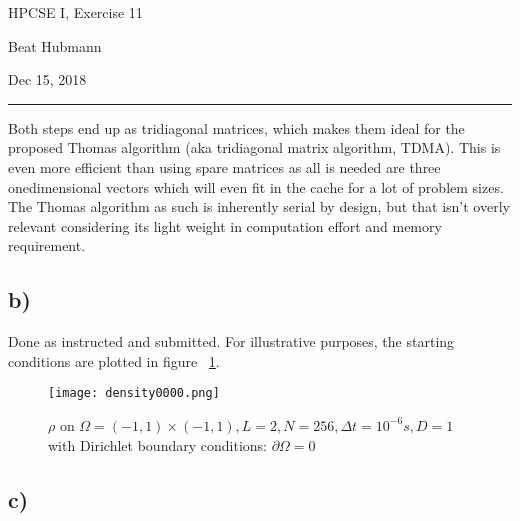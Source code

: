 \documentclass[11pt,a4paper]{article}
\begin{document}
\noindent\parbox{\linewidth}{
 \parbox{.25\linewidth}{ \large HPCSE I, Exercise 11 }\hfill
 \parbox{.5\linewidth}{\begin{center} \large Beat Hubmann \end{center}}\hfill
 \parbox{.2\linewidth}{\begin{flushright} \large Dec 15, 2018 \end{flushright}}
}
\noindent\rule{\linewidth}{2pt}



Both steps end up as tridiagonal matrices, which makes them ideal for the proposed
Thomas algorithm (aka tridiagonal matrix algorithm, TDMA). This is even more efficient than
using spare matrices as all is needed are three onedimensional vectors which will even
fit in the cache for a lot of problem sizes. The Thomas algorithm as such is inherently serial by design,
but that isn't overly relevant considering its light weight in computation effort and memory requirement.

\subsection{b)}

Done as instructed and submitted. For illustrative purposes, the starting conditions are plotted in figure~
\ref{fig:0_1}.

\begin{figure}[ht]
    \begin{center}
    \texttt{[image: density0000.png]} 
    \end{center}
    \caption{$\rho$ on $\Omega= (-1,1) \times (-1, 1), L=2, N=256, \Delta t = 10^{-6}s, D=1$ with Dirichlet boundary conditions: $\partial\Omega = 0$}
    \label{fig:0_1}
    \end{figure}

\subsection{c)}
\end{document}
